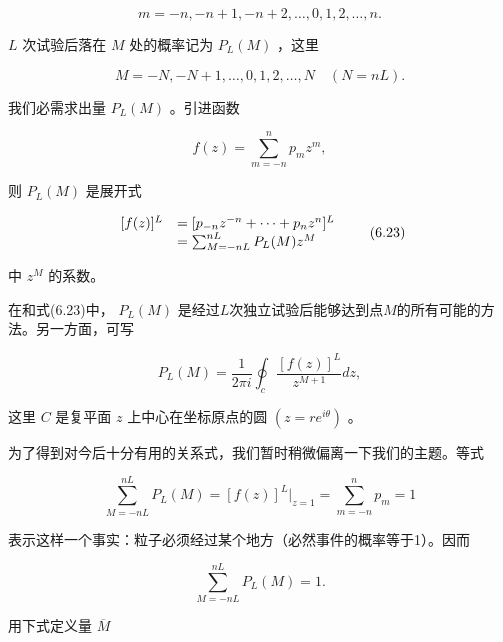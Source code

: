 \begin{equation*}
m = - n, - n + 1, - n + 2, \dots , 0, 1, 2, \dots , n.
\end{equation*}

$L$ 次试验后落在 $M$ 处的概率记为 $P_{L}(M)$ ，这里

\begin{equation*}
M = - N, - N + 1, \dots , 0, 1, 2, \dots , N \quad (N = n L).
\end{equation*}

我们必需求出量 $P_{L}(M)$ 。引进函数

\begin{equation*}
f (z) = \sum_ {m = - n} ^ {n} p _ {m} z ^ {m},
\end{equation*}

则 $P_{L}(M)$ 是展开式

\begin{equation*}
\begin{array}{r l} [ f (z) ] ^ {L} & = [ p _ {- n} z ^ {- n} + \dots + p _ {n} z ^ {n} ] ^ {L} \\ & = \sum_ {M = - n L} ^ {n L} P _ {L} (M) z ^ {M} \end{array}\tag{6.23}
\end{equation*}

中 $z^{M}$ 的系数。

在和式(6.23)中， $P_{L}(M)$ 是经过$L$次独立试验后能够达到点$M$的所有可能的方法。另一方面，可写

\begin{equation*}
P _ {L} (M) = \frac {1}{2 \pi i} \oint_ {c} \frac {[ f (z) ] ^ {L}}{z ^ {M + 1}} d z,\tag{6.24}
\end{equation*}

这里 $C$ 是复平面 $z$ 上中心在坐标原点的圆 $(z = r e^{i\theta})$ 。

为了得到对今后十分有用的关系式，我们暂时稍微偏离一下我们的主题。等式

\begin{equation*}
\sum_ {M = - n L} ^ {n L} P _ {L} (M) = [ f (z) ] ^ {L} \Bigg | _ {z = 1} = \sum_ {m = - n} ^ {n} p _ {m} = 1
\end{equation*}

表示这样一个事实：粒子必须经过某个地方（必然事件的概率等于1）。因而

\begin{equation*}
\sum_ {M = - n L} ^ {n L} P _ {L} (M) = 1.
\end{equation*}

用下式定义量 $\overline{M}$

